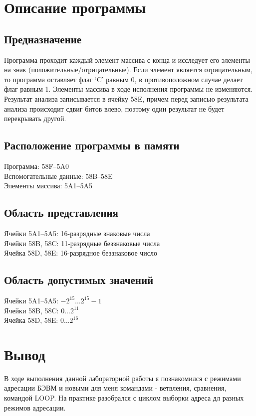 \section{Описание программы}
\subsection{Предназначение}
Программа проходит каждый элемент массива с конца и исследует его элементы на знак (положительные/отрицательные). Если элемент является отрицательным, то программа оставляет флаг `C' равным 0, в противоположном случае делает флаг равным 1. Элементы массива в ходе исполнения программы не изменяются. Результат анализа записывается в ячейку 58E, причем перед записью результата анализа происходит сдвиг битов влево, поэтому один результат не будет перекрывать другой.

\subsection{Расположение программы в памяти}
\noindent Программа: 58F--5A0\\
Вспомогательные данные: 58B--58E\\
Элементы массива: 5A1--5A5

\subsection{Область представления}
\noindent Ячейки 5A1--5A5: 16-разрядные знаковые числа\\
Ячейки 58B, 58C: 11-разрядные беззнаковые числа\\
Ячейка 58D, 58E: 16-разрядное беззнаковое число\\


\subsection{Область допустимых значений}
\noindent Ячейки 5A1--5A5: $-2^{15}\ldots2^{15}-1$\\
Ячейки 58B, 58C: $0\ldots2^{11}$\\
Ячейка 58D, 58E: $0\ldots2^{16}$\\

\section{Вывод}
В ходе выполнения данной лабораторной работы я познакомился с режимами адресации БЭВМ и новыми для меня командами - ветвления, сравнения, командой LOOP. На практике разобрался с циклом выборки адреса дл разных режимов адресации.